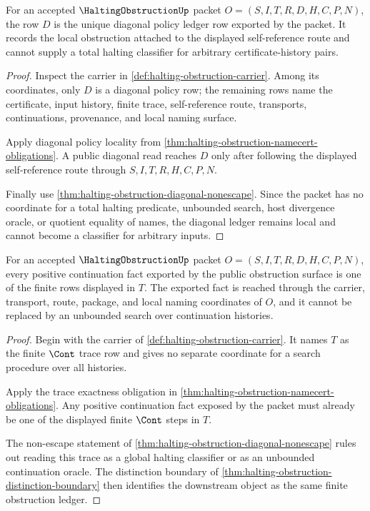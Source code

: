 \begin{theorem}
\label{thm:halting-obstruction-diagonal-policy-ledger-exactness}
For an accepted $\HaltingObstructionUp$ packet $O=(S,I,T,R,D,H,C,P,N)$, the row $D$ is the unique diagonal policy ledger row exported by the packet. It records the local obstruction attached to the displayed self-reference route and cannot supply a total halting classifier for arbitrary certificate-history pairs.
\end{theorem}
\begin{proof}
Inspect the carrier in \autoref{def:halting-obstruction-carrier}. Among its coordinates, only $D$ is a diagonal policy row; the remaining rows name the certificate, input history, finite trace, self-reference route, transports, continuations, provenance, and local naming surface.

Apply diagonal policy locality from \autoref{thm:halting-obstruction-namecert-obligations}. A public diagonal read reaches $D$ only after following the displayed self-reference route through $S,I,T,R,H,C,P,N$.

Finally use \autoref{thm:halting-obstruction-diagonal-nonescape}. Since the packet has no coordinate for a total halting predicate, unbounded search, host divergence oracle, or quotient equality of names, the diagonal ledger remains local and cannot become a classifier for arbitrary inputs.
\end{proof}

\begin{theorem}
\label{thm:halting-obstruction-positive-trace-ledger}
For an accepted $\HaltingObstructionUp$ packet $O=(S,I,T,R,D,H,C,P,N)$, every positive continuation fact exported by the public obstruction surface is one of the finite rows displayed in $T$. The exported fact is reached through the carrier, transport, route, package, and local naming coordinates of $O$, and it cannot be replaced by an unbounded search over continuation histories.
\end{theorem}
\begin{proof}
Begin with the carrier of \autoref{def:halting-obstruction-carrier}. It names $T$ as the finite $\Cont$ trace row and gives no separate coordinate for a search procedure over all histories.

Apply the trace exactness obligation in \autoref{thm:halting-obstruction-namecert-obligations}. Any positive continuation fact exposed by the packet must already be one of the displayed finite $\Cont$ steps in $T$.

The non-escape statement of \autoref{thm:halting-obstruction-diagonal-nonescape} rules out reading this trace as a global halting classifier or as an unbounded continuation oracle. The distinction boundary of \autoref{thm:halting-obstruction-distinction-boundary} then identifies the downstream object as the same finite obstruction ledger.
\end{proof}


